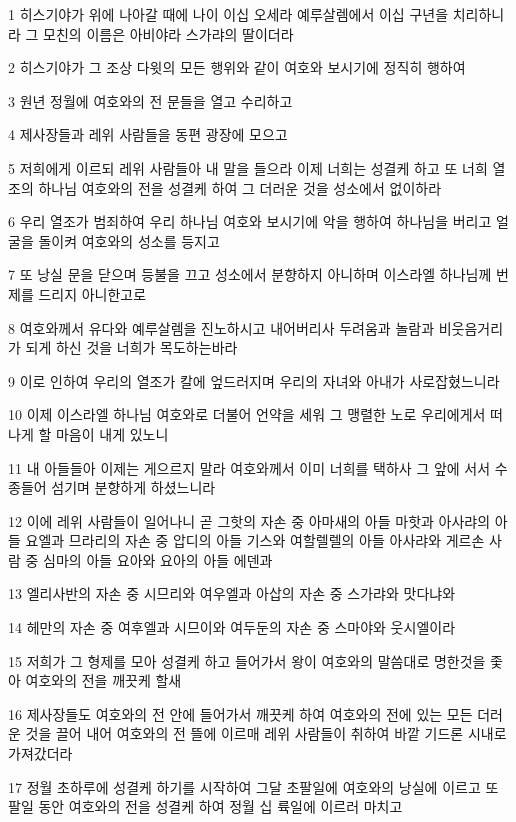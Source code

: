 \par 1 히스기야가 위에 나아갈 때에 나이 이십 오세라 예루살렘에서 이십 구년을 치리하니라 그 모친의 이름은 아비야라 스가랴의 딸이더라
\par 2 히스기야가 그 조상 다윗의 모든 행위와 같이 여호와 보시기에 정직히 행하여
\par 3 원년 정월에 여호와의 전 문들을 열고 수리하고
\par 4 제사장들과 레위 사람들을 동편 광장에 모으고
\par 5 저희에게 이르되 레위 사람들아 내 말을 들으라 이제 너희는 성결케 하고 또 너희 열조의 하나님 여호와의 전을 성결케 하여 그 더러운 것을 성소에서 없이하라
\par 6 우리 열조가 범죄하여 우리 하나님 여호와 보시기에 악을 행하여 하나님을 버리고 얼굴을 돌이켜 여호와의 성소를 등지고
\par 7 또 낭실 문을 닫으며 등불을 끄고 성소에서 분향하지 아니하며 이스라엘 하나님께 번제를 드리지 아니한고로
\par 8 여호와께서 유다와 예루살렘을 진노하시고 내어버리사 두려움과 놀람과 비웃음거리가 되게 하신 것을 너희가 목도하는바라
\par 9 이로 인하여 우리의 열조가 칼에 엎드러지며 우리의 자녀와 아내가 사로잡혔느니라
\par 10 이제 이스라엘 하나님 여호와로 더불어 언약을 세워 그 맹렬한 노로 우리에게서 떠나게 할 마음이 내게 있노니
\par 11 내 아들들아 이제는 게으르지 말라 여호와께서 이미 너희를 택하사 그 앞에 서서 수종들어 섬기며 분향하게 하셨느니라
\par 12 이에 레위 사람들이 일어나니 곧 그핫의 자손 중 아마새의 아들 마핫과 아사랴의 아들 요엘과 므라리의 자손 중 압디의 아들 기스와 여할렐렐의 아들 아사랴와 게르손 사람 중 심마의 아들 요아와 요아의 아들 에덴과
\par 13 엘리사반의 자손 중 시므리와 여우엘과 아삽의 자손 중 스가랴와 맛다냐와
\par 14 헤만의 자손 중 여후엘과 시므이와 여두둔의 자손 중 스마야와 웃시엘이라
\par 15 저희가 그 형제를 모아 성결케 하고 들어가서 왕이 여호와의 말씀대로 명한것을 좇아 여호와의 전을 깨끗케 할새
\par 16 제사장들도 여호와의 전 안에 들어가서 깨끗케 하여 여호와의 전에 있는 모든 더러운 것을 끌어 내어 여호와의 전 뜰에 이르매 레위 사람들이 취하여 바깥 기드론 시내로 가져갔더라
\par 17 정월 초하루에 성결케 하기를 시작하여 그달 초팔일에 여호와의 낭실에 이르고 또 팔일 동안 여호와의 전을 성결케 하여 정월 십 륙일에 이르러 마치고
